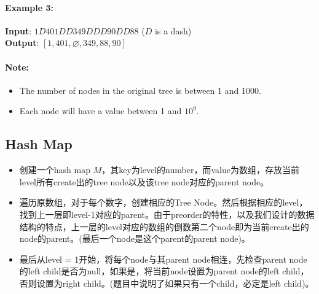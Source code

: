 \paragraph{Example 3:}
\begin{flushleft}
\begin{figure}[H]
\end{figure}
\textbf{Input}: $1D401DD349DDD90DD88$ ($ D $ is a dash)
\\
\textbf{Output}: $[1,401,\varnothing,349,88,90]$
\end{flushleft}

\paragraph{Note:}

\begin{itemize}
\item The number of nodes in the original tree is between 1 and 1000. 
\item Each node will have a value between 1 and $ 10^9 $.
\end{itemize}

\subsection{Hash Map}
\begin{itemize}
\item 创建一个hash map $M$，其key为level的number，而value为数组，存放当前level所有create出的tree node以及该tree node对应的parent node。
\item 遍历原数组，对于每个数字，创建相应的Tree Node。然后根据相应的level，找到上一层即level-1对应的parent。由于preorder的特性，以及我们设计的数据结构的特点，上一层的level对应的数组的倒数第二个node即为当前create出的node的parent。(最后一个node是这个parent的parent node)。
\item 最后从level = 1开始，将每个node与其parent node相连，先检查parent node的left child是否为null，如果是，将当前node设置为parent node的left child，否则设置为right child。(题目中说明了如果只有一个child，必定是left child)。
\end{itemize}

